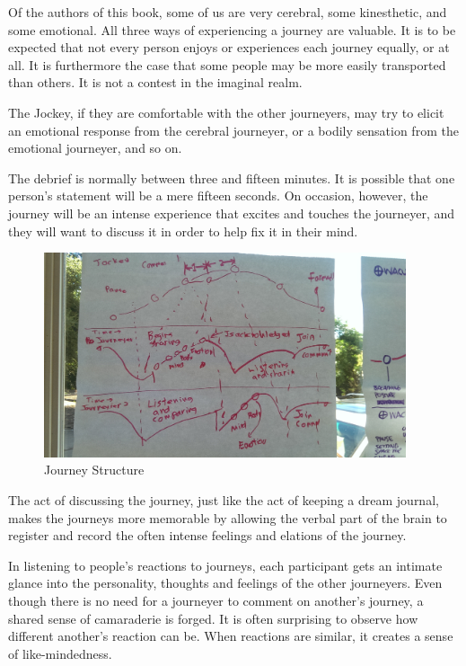 \documentclass[12pt]{book}
\begin{document}
Of the authors of this book, some of us are very cerebral, some kinesthetic, and some emotional. All three ways of experiencing a journey are valuable. It is to be expected that not every person enjoys or experiences each journey equally, or at all. It is furthermore the case that some people may be more easily transported than others. It is not a contest in the imaginal realm.
					
The Jockey, if they are comfortable with the other journeyers, may try to elicit an emotional response from the cerebral journeyer, or a bodily sensation from the emotional journeyer, and so on.
					
The debrief is normally between three and fifteen minutes. It is possible that one person’s statement will be a mere fifteen seconds. On occasion, however, the journey will be an intense experience that excites and touches the journeyer, and they will want to discuss it in order to help fix it in their mind.



\begin{figure}
  \centering
     \includegraphics[width=0.95\textwidth]{WacuriFigures/JourneyerInteraction.jpg}
     \caption{Journey Structure}
  \label{fig:closeup}     
\end{figure}

The act of discussing the journey, just like the act of keeping a dream journal, makes the journeys more memorable by allowing the verbal part of the brain to register and record the often intense feelings and elations of the journey.
					
In listening to people’s reactions to journeys, each participant gets an intimate glance into the personality, thoughts and feelings of the other journeyers. Even though there is no need for a journeyer to comment on another’s journey, a shared sense of camaraderie is forged. It is often surprising to observe how different another’s reaction can be. When reactions are similar, it creates a sense of like-mindedness.
					
\end{document}
